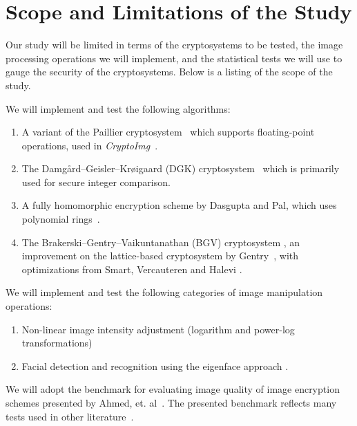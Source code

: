 \section{Scope and Limitations of the Study}
Our study will be limited in terms of the cryptosystems to be tested, the image processing operations we will implement, and the statistical tests we will use to gauge the security of the cryptosystems. Below is a listing of the scope of the study.

We will implement and test the following algorithms:
\begin{enumerate}
	\item A variant of the Paillier cryptosystem~\cite{stern_public-key_1999} which supports floating-point operations, used in \textit{CryptoImg}~\cite{ziad_cryptoimg:_2016}.
    \item The Damg{\aa}rd--Geisler--Kr{\o}igaard (DGK) cryptosystem~\cite{pieprzyk_efficient_2007, cryptoeprint:2008:321} which is primarily used for secure integer comparison.
	\item A fully homomorphic encryption scheme by Dasgupta and Pal, which uses polynomial rings~\cite{dasgupta_design_2016}.
	\item The Brakerski--Gentry--Vaikuntanathan (BGV) cryptosystem \cite{cryptoeprint:2011:277}, an improvement on the lattice-based cryptosystem by Gentry~\cite{gentry_fully_2009}, with optimizations from Smart, Vercauteren and Halevi \cite{hutchison_fully_2010, cryptoeprint:2011:566}.
\end{enumerate}
We will implement and test the following categories of image manipulation operations:
\begin{enumerate}
	\item Non-linear image intensity adjustment (logarithm and power-log transformations)
	\item Facial detection and recognition using the eigenface approach \cite{turk_eigenfaces_1991}.
\end{enumerate}
We will adopt the benchmark for evaluating image quality of image encryption schemes presented by Ahmed, et. al~\cite{ahmed_benchmark_2016}. The presented benchmark reflects many tests used in other literature~\cite{ahmad_efficiency_2012, wu_npcr_2011}.
